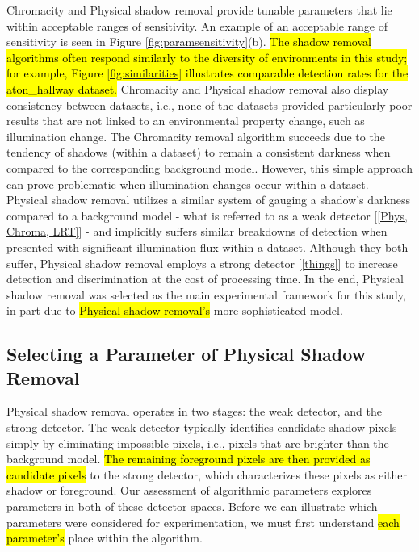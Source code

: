 Chromacity and Physical shadow removal provide tunable parameters that lie within acceptable ranges of sensitivity. An example of an acceptable range of sensitivity is seen in Figure \ref{fig:paramsensitivity}(b). \hl{The shadow removal algorithms often respond similarly to the diversity of environments in this study; for example, Figure \ref{fig:similarities} illustrates comparable detection rates for the aton\_hallway dataset.} Chromacity and Physical shadow removal also display consistency between datasets, i.e., none of the datasets provided particularly poor results that are not linked to an environmental property change, such as illumination change. The Chromacity removal algorithm succeeds due to the tendency of shadows (within a dataset) to remain a consistent darkness when compared to the corresponding background model. However, this simple approach can prove problematic when illumination changes occur within a dataset. Physical shadow removal utilizes a similar system of gauging a shadow's darkness compared to a background model - what is referred to as a weak detector [\ref{Phys, Chroma, LRT}] - and implicitly suffers similar breakdowns of detection when presented with significant illumination flux within a dataset. Although they both suffer, Physical shadow removal employs a strong detector [\ref{things}] to increase detection and discrimination at the cost of processing time. In the end, Physical shadow removal was selected as the main experimental framework for this study, in part due to \hl{Physical shadow removal's} more sophisticated model.

\subsection{Selecting a Parameter of Physical Shadow Removal} \label{section:selectparameter}

Physical shadow removal operates in two stages: the weak detector, and the strong detector. The weak detector typically identifies candidate shadow pixels simply by eliminating impossible pixels, i.e., pixels that are brighter than the background model. \hl{The remaining foreground pixels are then provided as candidate pixels} to the strong detector, which characterizes these pixels as either shadow or foreground. Our assessment of algorithmic parameters explores parameters in both of these detector spaces. Before we can illustrate which parameters were considered for experimentation, we must first understand \hl{each parameter's} place within the algorithm.

